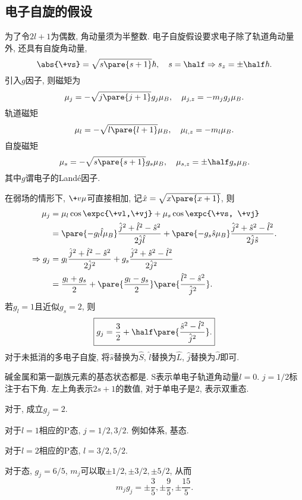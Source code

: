 \documentclass[hidelinks]{ctexart}
\begin{document}

\subsection{电子自旋的假设} %
\label{sub:电子自旋的假设}

为了令$2l+1$为偶数, 角动量须为半整数. 电子自旋假设要求电子除了轨道角动量外, 还具有自旋角动量,
\[ \abs{\+vs} = \sqrt{s\pare{s+1}}\hbar,\quad s = \half \Rightarrow s_z = \pm \half \hbar. \]
引入$g$因子, 则磁矩为
\[ \mu_j = -\sqrt{j\pare{j+1}}g_j \mu_B,\quad \mu_{j,z} = -m_j g_j\mu_B. \]
轨道磁矩
\[ \mu_l = -\sqrt{l\pare{l+1}}\mu_B,\quad \mu_{l,z} = -m_l\mu_B. \]
自旋磁矩
\[ \mu_s = -\sqrt{s\pare{s+1}}g_s\mu_B,\quad \mu_{s,z} = \pm \half g_s\mu_B. \]
其中$g$谓电子的Land\'e因子.
\par
在弱场的情形下, $\+v\mu$可直接相加, 记$\hat x = \sqrt{x\pare{x+1}}$, 则
\begin{align*}
    \mu_j &= \mu_l \cos\expc{\+vl,\+vj} + \mu_s \cos\expc{\+vs, \+vj} \\
    &= \pare{-g_l\hat l \mu_B} \frac{\hat j^2 + \hat l ^2 - \hat s^2}{2\hat j \hat l} + \pare{-g_s\hat s \mu_B} \frac{\hat j^2 + \hat s^2 - \hat l ^2}{2\hat j \hat s}.\\
    \Rightarrow g_j &= g_l \frac{\hat j^2 + \hat l^2 - \hat s^2}{2\hat j^2} + g_s\frac{\hat j^2 + \hat s^2 - \hat l^2}{2\hat j^2} \\
    &= \frac{g_l + g_s}{2} + \pare{\frac{g_l - g_s}{2}}\pare{\frac{\hat l^2 - \hat s^2}{\hat j^2}}.
\end{align*}
若$g_l = 1$且近似$g_s = 2$, 则
\[ \boxed{g_j = \frac{3}{2} + \half \pare{\frac{\hat s^2 - \hat l^2}{\hat j^2}}.} \]
对于未抵消的多电子自旋, 将$\hat s$替换为$\hat S$, $\hat l$替换为$\hat L$, $\hat j$替换为$\hat J$即可.
\par
碱金属和第一副族元素的基态状态都是. S表示单电子轨道角动量$l=0$. $j=1/2$标注于右下角. 左上角表示$2s+1$的数值, 对于单电子是$2$, 表示双重态.
\begin{ex}
    对于, 成立$g_j=2$.
\end{ex}
\begin{ex}
    对于$l=1$相应的P态, $j=1/2,3/2$. 例如体系, 基态.
\end{ex}
\begin{ex}
    对于$l=2$相应的P态, $l=3/2,5/2$.
\end{ex}
\begin{ex}
    对于态, $g_j = 6/5$, $m_j$可以取$\pm 1/2, \pm 3/2, \pm 5/2$, 从而
    \[ m_j g_j = \pm \frac{3}{5},\pm \frac{9}{5},\pm \frac{15}{5}. \]
\end{ex}
\end{document}
